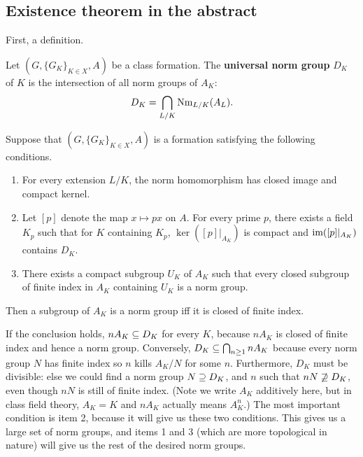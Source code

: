 \subsection{Existence theorem in the abstract}
First, a definition.
\begin{df}
Let $(G, \{G_K\}_{K\in X}, A)$ be a class formation. 
The \textbf{universal norm group} $D_K$ of $K$ is the intersection of all norm groups of $A_K$:
\[
D_K=\bigcap_{L/K} \operatorname{Nm}_{L/K}(A_L).
\]
\end{df}
\begin{thm}
Suppose that $(G, \{G_K\}_{K\in X}, A)$ is a formation satisfying the following conditions.
\begin{enumerate}
\item
For every extension $L/K$, the norm homomorphism has closed image and compact kernel.
\item
Let $[p]$ denote the map $x\mapsto px$ on $A$. 
For every prime $p$, there exists a field $K_p$ such that for $K$ containing $K_p$, $\ker([p]|_{A_K})$ is compact and $\text{im}([p]|_{A_K})$ contains $D_K$.
\item There exists a compact subgroup $U_K$ of $A_K$ such that every closed subgroup of finite index in $A_K$ containing $U_K$ is a norm group.
\end{enumerate}
Then a subgroup of $A_K$ is a norm group iff it is closed of finite index.
\end{thm}
If the conclusion holds, $nA_K\subseteq D_K$ for every $K$, because $nA_K$ is closed of finite index and hence a norm group. Conversely, $D_K\subseteq \bigcap_{n\ge 1} nA_K$ because every norm group $N$ has finite index so $n$ kills $A_K/N$ for some $n$. Furthermore, $D_K$ must be divisible: else we could find a norm group $N\supseteq D_K$, and $n$ such that $nN\not\supseteq D_K$, even though $nN$ is still of finite index. 
(Note we write $A_K$ additively here, but in class field theory, $A_K=K$ and $nA_K$ actually means $A_K^n$.)
The most important condition is item 2, because it will give us these two conditions. This gives us a large set of norm groups, and items 1 and 3 (which are more topological in nature) will give us the rest of the desired norm groups.
